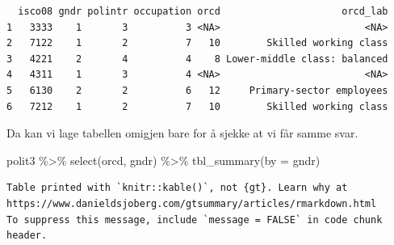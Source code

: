 \documentclass[
  letterpaper,
  DIV=11,
  numbers=noendperiod]{scrreprt}
\newenvironment{Shaded}{\begin{snugshade}}{\end{snugshade}}
\newcommand{\AttributeTok}[1]{\textcolor[rgb]{0.40,0.45,0.13}{#1}}
\newcommand{\ConstantTok}[1]{\textcolor[rgb]{0.56,0.35,0.01}{#1}}
\newcommand{\FunctionTok}[1]{\textcolor[rgb]{0.28,0.35,0.67}{#1}}
\newcommand{\NormalTok}[1]{\textcolor[rgb]{0.00,0.23,0.31}{#1}}
\newcommand{\OtherTok}[1]{\textcolor[rgb]{0.00,0.23,0.31}{#1}}
\newcommand{\SpecialCharTok}[1]{\textcolor[rgb]{0.37,0.37,0.37}{#1}}
\theoremstyle{definition}
\theoremstyle{remark}
\begin{document}
\begin{Shaded}
\end{Shaded}

\begin{verbatim}
  isco08 gndr polintr occupation orcd                     orcd_lab
1   3333    1       3          3 <NA>                         <NA>
2   7122    1       2          7   10        Skilled working class
3   4221    2       4          4    8 Lower-middle class: balanced
4   4311    1       3          4 <NA>                         <NA>
5   6130    2       2          6   12     Primary-sector employees
6   7212    1       2          7   10        Skilled working class
\end{verbatim}

Da kan vi lage tabellen omigjen bare for å sjekke at vi får samme svar.

\begin{Shaded}
\begin{Highlighting}[]
\NormalTok{polit3 }\SpecialCharTok{\%\textgreater{}\%} 
  \FunctionTok{select}\NormalTok{(orcd, gndr) }\SpecialCharTok{\%\textgreater{}\%} 
  \FunctionTok{tbl\_summary}\NormalTok{(}\AttributeTok{by =}\NormalTok{ gndr)}
\end{Highlighting}
\end{Shaded}

\begin{verbatim}
Table printed with `knitr::kable()`, not {gt}. Learn why at
https://www.danieldsjoberg.com/gtsummary/articles/rmarkdown.html
To suppress this message, include `message = FALSE` in code chunk header.
\end{verbatim}
\end{document}
